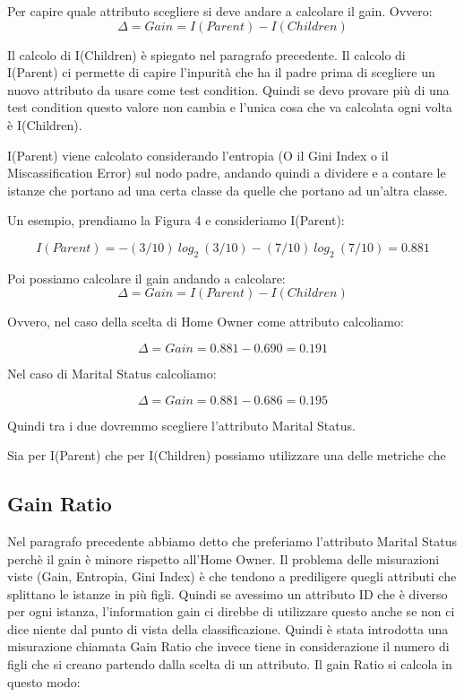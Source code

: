 \documentclass[14pt]{extreport}
\begin{document}
Per capire quale attributo scegliere si deve andare a calcolare il \b{gain}. Ovvero:
\begin{equation}
    \Delta = Gain = I(Parent) - I(Children)
\end{equation}

Il calcolo di I(Children) è spiegato nel paragrafo precedente. 
Il calcolo di I(Parent) ci permette di capire l'inpurità che ha il padre prima di scegliere un nuovo attributo da usare come test condition. Quindi se devo provare più di una test condition questo valore non cambia e l'unica cosa che va calcolata ogni volta è I(Children).

I(Parent) viene calcolato considerando l'entropia (O il Gini Index o il Miscassification Error) sul nodo padre, andando quindi a dividere e a contare le istanze che portano ad una certa classe da quelle che portano ad un'altra classe.

Un esempio, prendiamo la Figura 4 e consideriamo I(Parent):

\begin{equation}  
    I(Parent) = - (3/10)\ log_2\ (3/10) - (7/10)\ log_2\ (7/10) = 0.881
\end{equation}

Poi possiamo calcolare il gain andando a calcolare:
\begin{equation}
    \Delta = Gain = I(Parent) - I(Children)
\end{equation}

Ovvero, nel caso della scelta di Home Owner come attributo calcoliamo:

\begin{equation}
    \Delta = Gain = 0.881 - 0.690 = 0.191
\end{equation}

Nel caso di Marital Status calcoliamo:


\begin{equation}
    \Delta = Gain = 0.881 - 0.686 = 0.195
\end{equation}

Quindi tra i due dovremmo scegliere l'attributo Marital Status.

Sia per I(Parent) che per I(Children) possiamo utilizzare una delle metriche che

\subsection{Gain Ratio}

Nel paragrafo precedente abbiamo detto che preferiamo l'attributo Marital Status perchè il gain è minore rispetto all'Home Owner.
Il problema delle misurazioni viste (Gain, Entropia, Gini Index) è che tendono a prediligere quegli attributi che splittano le istanze in più figli. Quindi se avessimo un attributo ID che è diverso per ogni istanza, l'information gain ci direbbe di utilizzare questo anche se non ci dice niente dal punto di vista della classificazione.
Quindi è stata introdotta una misurazione chiamata Gain Ratio che invece tiene in considerazione il numero di figli che si creano partendo dalla scelta di un attributo.
Il gain Ratio si calcola in questo modo:
\end{document}
